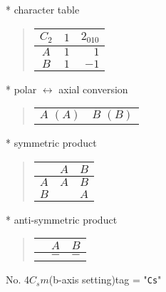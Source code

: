 \documentclass[fleqn,10pt,landscape]{jsarticle}
\begin{document}
* character table
\begin{quote}
\begin{tabular}{crr} \hline \hline
$ C_{2} $ & $ 1 $ & $ 2{}_{010} $ \\ \hline
$ A $ & $ 1 $ & $ 1 $ \\
$ B $ & $ 1 $ & $ -1 $ \\
 \hline \hline
\end{tabular}
\end{quote}
* polar $\leftrightarrow$ axial conversion
\begin{quote}
\begin{tabular}{cc}
$ A\,\,(A) $ & $ B\,\,(B) $
\end{tabular}
\end{quote}
* symmetric product
\begin{quote}
\begin{tabular}{c|cc} \hline \hline
 & $ A $ & $ B $ \\ \hline
$ A $ & $ A $ & $ B $ \\
$ B $ & $  $ & $ A $ \\
 \hline \hline
\end{tabular}
\end{quote}
* anti-symmetric product
\begin{quote}
\begin{tabular}{ccc} \hline \hline
 & $ A $ & $ B $ \\ \hline
$  $ & $ - $ & $ - $ \\
 \hline \hline
\end{tabular}
\end{quote}
\newpage
No. 4\quad$C_{s}$\quad$m$\quad(b-axis setting)\quad[ monoclinic ]
tag = "{\tt Cs}"
\end{document}
